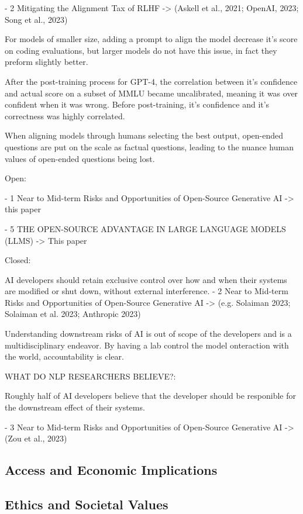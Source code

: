 - 2 Mitigating the Alignment Tax of RLHF -> (Askell et al., 2021; OpenAI, 2023; Song et al., 2023)
\citep{askell_general_2021}

For models of smaller size, adding a prompt to align the model decrease it's score on coding evaluations, but larger models do not have this issue, in fact they preform slightly better.

\citep{openai_gpt_4_2023}

After the post-training process for GPT-4, the correlation between it's confidence and actual score on a subset of MMLU became uncalibrated, meaning it was over confident when it was wrong. Before post-training, it's confidence and it's correctness was highly correlated.

\citep{song_reward_2023}

When aligning models through humans selecting the best output, open-ended questions are put on the scale as factual questions, leading to the nuance human values of open-ended questions being lost.

Open: 

- 1 Near to Mid-term Risks and Opportunities of Open-Source Generative AI -> this paper
\citep{eiras_near_2024}

- 5 THE OPEN-SOURCE ADVANTAGE IN LARGE LANGUAGE MODELS (LLMS) -> This paper
\citep{manchanda_open_2025}

Closed:

AI developers should retain exclusive control over how and when their systems are modified or shut down, without external interference.
- 2 Near to Mid-term Risks and Opportunities of Open-Source Generative AI -> (e.g. Solaiman 2023; Solaiman et al. 2023; Anthropic 2023)
\citep{solaiman_gradient_2023}

Understanding downstream risks of AI is out of scope of the developers and is a multidisciplinary endeavor. By having a lab control the model onteraction with the world, accountability is clear.

WHAT DO NLP RESEARCHERS BELIEVE?:

Roughly half of AI developers believe that the developer should be responible for the downstream effect of their systems.

\citep{solaiman_evaluating_2024}

- 3 Near to Mid-term Risks and Opportunities of Open-Source Generative AI -> (Zou et al., 2023)
\citep{zou_universal_2023}

\subsection{Access and Economic Implications}

\subsection{Ethics and Societal Values}
